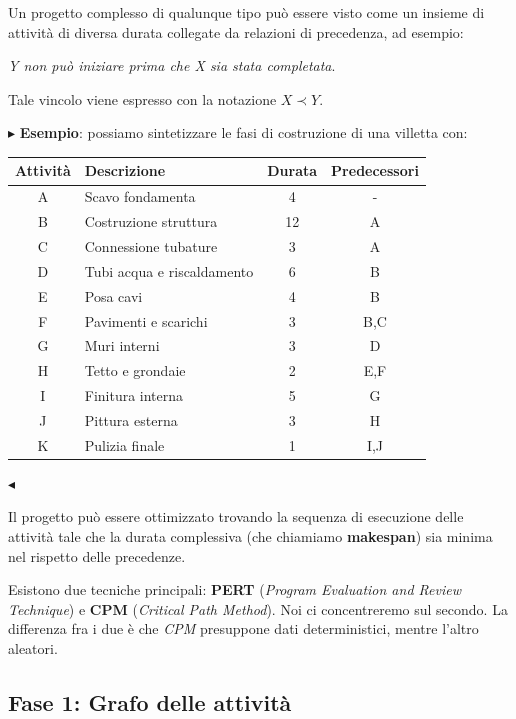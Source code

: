 \documentclass[11pt]{book}
\begin{document}
Un progetto complesso di qualunque tipo pu\`o essere visto come un
insieme di attivit\`a di diversa durata collegate da relazioni di
precedenza, ad esempio:

\begin{center}
{\em Y non pu\`o iniziare prima che X sia stata completata}.  
\end{center}

Tale vincolo viene espresso con la notazione $X \prec Y$.

\vspace{11pt}
$\blacktriangleright$ {\bf Esempio}: possiamo sintetizzare le fasi di
costruzione di una villetta con:

\begin{center}
\begin{tabular}{clcc}
{\bf Attivit\`a} & {\bf Descrizione} & {\bf Durata} & {\bf
  Predecessori} \\\hline
A & Scavo fondamenta & 4 & -\\
B & Costruzione struttura & 12 & A \\
C & Connessione tubature & 3 & A \\
D & Tubi acqua e riscaldamento & 6 & B \\
E & Posa cavi & 4 & B \\
F & Pavimenti e scarichi & 3 & B,C \\
G & Muri interni & 3 & D \\
H & Tetto e grondaie & 2 & E,F \\
I & Finitura interna & 5 & G \\
J & Pittura esterna & 3 & H \\
K & Pulizia finale & 1 & I,J \\
\hline  
\end{tabular}
\end{center}
$\blacktriangleleft$
\vspace{11pt}

Il progetto pu\`o essere ottimizzato trovando la sequenza di
esecuzione delle attivit\`a tale che la durata complessiva (che
chiamiamo {\bf makespan}) sia minima nel rispetto delle precedenze.

Esistono due tecniche principali: {\bf PERT} ({\em Program Evaluation
  and Review Technique}) e {\bf CPM} ({\em Critical Path Method}). Noi
ci concentreremo sul secondo. La differenza fra i due \`e che {\em
  CPM} presuppone dati deterministici, mentre l'altro aleatori.

\subsection{Fase 1: Grafo delle attivit\`a}
\end{document}
